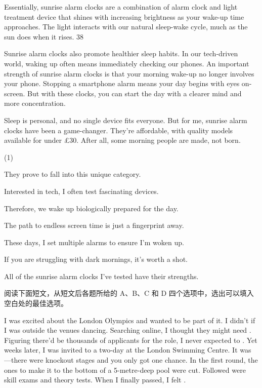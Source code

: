 \documentclass{英语试卷}
\begin{document}
\par Essentially, sunrise alarm clocks are a combination of alarm clock and light treatment device that shines with increasing brightness as your wake-up time approaches. The light interacts with our natural sleep-wake cycle, much as the sun does when it rises. 38\par
\par Sunrise alarm clocks also promote healthier sleep habits. In our tech-driven world, waking up often means immediately checking our phones. An important strength of sunrise alarm clocks is that your morning wake-up no longer involves your phone. Stopping a smartphone alarm means your day begins with eyes on-screen.  But with these clocks, you can start the day with a clearer mind and more concentration.\par
\par Sleep is personal, and no single device fits everyone. But for me, sunrise alarm clocks have been a game-changer. They're affordable, with quality models available for under £30.  After all, some morning people are made, not born.\par
\begin{choices}(1)
  \item They prove to fall into this unique category.
  \item Interested in tech, I often test fascinating devices.
  \item Therefore, we wake up biologically prepared for the day.
  \item The path to endless screen time is just a fingerprint away.
  \item These days, I set multiple alarms to ensure I'm woken up.
  \item If you are struggling with dark mornings, it's worth a shot.
  \item All of the sunrise alarm clocks I've tested have their strengths.
\end{choices}
\par 阅读下面短文，从短文后各题所给的 A、B、C 和 D 四个选项中，选出可以填入空白处的最佳选项。\par
\par I was excited about the London Olympics and wanted to be part of it. I didn't  if I was outside the venues dancing. Searching online, I thought they might need . Figuring there'd be thousands of applicants for the role, I never expected to . Yet weeks later, I was invited to a two-day  at the London Swimming Centre. It was —there were knockout stages and you only got one chance. In the first round, the ones  to make it to the bottom of a 5-metre-deep pool were cut. Followed were skill exams and theory tests. When I finally passed, I felt .\par
\end{document}
